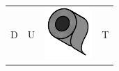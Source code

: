 \documentclass[crop,border=1pt]{standalone}
\begin{document}
\aunclfamily\itshape 
\begin{tabular}{ l l l l }
	{D\hspace*{-11pt}} & {U\hspace*{-11pt}} & {\includegraphics[height=1.1\fontcharht\font`\B, trim={6pt 12pt 6pt 0pt}]{logo.pdf}\hspace*{-11pt}} & {T} 
\end{tabular}
\end{document}
